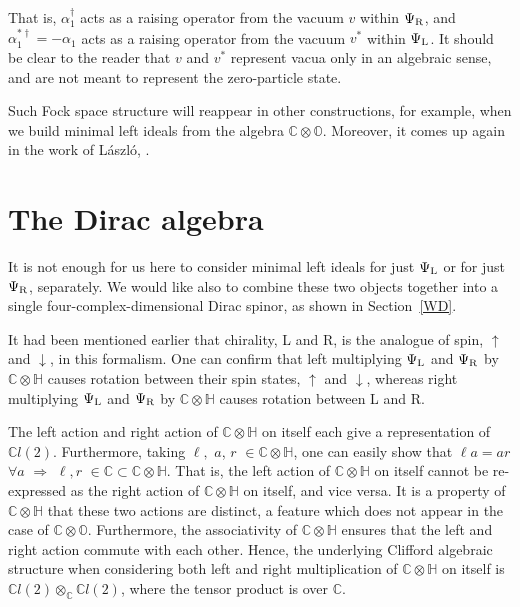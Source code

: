 \documentclass[letterpaper,12pt,titlepage,oneside,final]{book}
\newcommand{\CH}{\mathbb{C}\otimes\mathbb{H}}
\newcommand{\CO}{\mathbb{C}\otimes\mathbb{O}}
\newcommand{\CLtwo}{\mathbb{C}l(2)}
\begin{document}
\noindent That is, $\alpha_1^{\dagger}$ acts as a raising operator from the vacuum $v$ within $\Psi_{\textup{R}}$, and $\alpha_1^{*\dagger} = -\alpha_1$ acts as a raising operator from the vacuum $v^*$ within $\Psi_{\textup{L}}$.  It should be clear to the reader that $v$ and $v^*$ represent vacua only in an algebraic sense, and are not meant to represent the zero-particle state.

Such Fock space structure will reappear in other constructions, for example, when we build minimal left ideals from the algebra $\CO$.  Moreover, it comes up again in the work of L\'{a}szl\'{o}, \cite{andras}.

\section{The Dirac algebra \label{da}  }

It is not enough for us here to consider minimal left ideals for just $\Psi_{\textup{L}}$ or for just $\Psi_{\textup{R}}$, separately.  We would like also to combine these two objects together into a single four-complex-dimensional Dirac spinor, as shown in Section~\ref{WD}.

It had been mentioned earlier that chirality, L and R, is the analogue of spin, $\uparrow$ and $\downarrow$, in this formalism.  One can confirm that left multiplying $\Psi_{\textup{L}}$ and $\Psi_{\textup{R}}$ by $\CH$ causes rotation between their spin states, $\uparrow$ and $\downarrow$, whereas right multiplying $\Psi_{\textup{L}}$ and $\Psi_{\textup{R}}$ by $\CH$ causes rotation between L and R.  


The left action and right action of $\CH$ on itself each give a representation of $\CLtwo$.  Furthermore, taking $\ell,$ $a$, $r$ $\in\CH$, one can easily show that $\ell a = ar$ $\forall a$ $\Rightarrow$ $\ell, r$ $\in\mathbb{C} \subset \CH$.  That is, the left action of $\CH$ on itself cannot be re-expressed as the right action of $\CH$ on itself, and vice versa.  It is a property of $\CH$ that these two actions are distinct, a feature which does not appear in the case of $\CO$.  Furthermore, the associativity of $\CH$ ensures that the left and right action commute with each other.  Hence, the underlying Clifford algebraic structure when considering both left and right multiplication of $\CH$ on itself is $\CLtwo\otimes_{\mathbb{C}}\CLtwo$, where the tensor product is over $\mathbb{C}$. 
\end{document}
